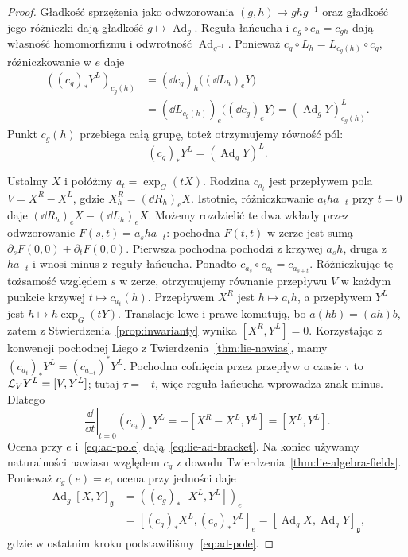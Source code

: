 \begin{proof}
Gładkość sprzężenia jako odwzorowania $(g,h)\mapsto ghg^{-1}$
oraz gładkość jego różniczki dają gładkość $g\mapsto
\operatorname{Ad}_g$. Reguła łańcucha i
$c_g\circ c_h=c_{gh}$ dają własność homomorfizmu
i odwrotność $\operatorname{Ad}_{g^{-1}}$.
Ponieważ $c_g\circ L_h=L_{c_g(h)}\circ c_g$,
różniczkowanie w $e$ daje
\[
 \begin{aligned}
 ((c_g)_*Y^L)_{c_g(h)}
 &=(\dd c_g)_h\bigl((\dd L_h)_eY\bigr)\\
 &=(\dd L_{c_g(h)})_e\bigl((\dd c_g)_eY\bigr)
   =(\operatorname{Ad}_gY)^L_{c_g(h)}.
 \end{aligned}
\]
Punkt $c_g(h)$ przebiega całą grupę, toteż otrzymujemy równość pól:
\begin{equation}\label{eq:ad-pole}
 (c_g)_*Y^L=(\operatorname{Ad}_gY)^L.
\end{equation}

Ustalmy $X$ i połóżmy $a_t=\exp_G(tX)$.
Rodzina $c_{a_t}$ jest przepływem pola
$V=X^R-X^L$, gdzie $X^R_h=(\dd R_h)_eX$.
Istotnie, różniczkowanie $a_t h a_{-t}$ przy $t=0$
daje $(\dd R_h)_eX-(\dd L_h)_eX$.
Możemy rozdzielić te dwa wkłady przez odwzorowanie
$F(s,t)=a_s h a_{-t}$: pochodna $F(t,t)$ w zerze
jest sumą $\partial_sF(0,0)+\partial_tF(0,0)$.
Pierwsza pochodna pochodzi z krzywej $a_s h$,
druga z $h a_{-t}$ i wnosi minus z reguły łańcucha.
Ponadto $c_{a_s}\circ c_{a_t}=c_{a_{s+t}}$.
Różniczkując tę tożsamość względem $s$ w zerze,
otrzymujemy równanie przepływu $V$ w każdym punkcie
krzywej $t\mapsto c_{a_t}(h)$.
Przepływem $X^R$ jest $h\mapsto a_t h$, a przepływem
$Y^L$ jest $h\mapsto h\exp_G(tY)$. Translacje lewe
i prawe komutują, bo $a(hb)=(ah)b$, zatem z
Stwierdzenia~\ref{prop:inwarianty} wynika
$[X^R,Y^L]=0$. Korzystając z konwencji pochodnej
Liego z Twierdzenia~\ref{thm:lie-nawias}, mamy
$(c_{a_t})_*Y^L=(c_{a_{-t}})^*Y^L$.
Pochodna cofnięcia przez przepływ o czasie $\tau$ to
$\mathcal L_VY^L=[V,Y^L]$; tutaj $\tau=-t$, więc
reguła łańcucha wprowadza znak minus. Dlatego
\[
 \left.\frac{\dd}{\dd t}\right|_{t=0}
 (c_{a_t})_*Y^L
 =-[X^R-X^L,Y^L]=[X^L,Y^L].
\]
Ocena przy $e$ i~\eqref{eq:ad-pole} dają~\eqref{eq:lie-ad-bracket}.
Na koniec używamy naturalności nawiasu względem $c_g$
z dowodu Twierdzenia~\ref{thm:lie-algebra-fields}.
Ponieważ $c_g(e)=e$, ocena przy jedności daje
\[
 \begin{aligned}
 \operatorname{Ad}_g[X,Y]_{\mathfrak g}
 &=((c_g)_*[X^L,Y^L])_e\\
 &=[(c_g)_*X^L,(c_g)_*Y^L]_e
 =[\operatorname{Ad}_gX,\operatorname{Ad}_gY]_{\mathfrak g},
 \end{aligned}
\]
gdzie w ostatnim kroku podstawiliśmy~\eqref{eq:ad-pole}.
\end{proof}

